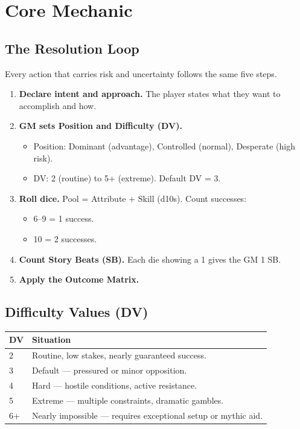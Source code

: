 
\section{Core Mechanic}

\subsection{The Resolution Loop}

Every action that carries risk and uncertainty follows the same five steps.

\begin{enumerate}
  \item \textbf{Declare intent and approach.} The player states what they want to accomplish and how.
  \item \textbf{GM sets Position and Difficulty (DV).}
  \begin{itemize}
    \item Position: Dominant (advantage), Controlled (normal), Desperate (high risk).
    \item DV: 2 (routine) to 5+ (extreme). Default DV = 3.
  \end{itemize}
  \item \textbf{Roll dice.} Pool = Attribute + Skill (d10s). Count successes:
  \begin{itemize}
    \item 6–9 = 1 success.
    \item 10 = 2 successes.
  \end{itemize}
  \item \textbf{Count Story Beats (SB).} Each die showing a 1 gives the GM 1 SB.
  \item \textbf{Apply the Outcome Matrix.}
\end{enumerate}

\subsection{Difficulty Values (DV)}

\begin{tabular}{@{}ll@{}}
\toprule
\textbf{DV} & \textbf{Situation} \\
\midrule
2 & Routine, low stakes, nearly guaranteed success. \\
3 & Default — pressured or minor opposition. \\
4 & Hard — hostile conditions, active resistance. \\
5 & Extreme — multiple constraints, dramatic gambles. \\
6+ & Nearly impossible — requires exceptional setup or mythic aid. \\
\bottomrule
\end{tabular}

